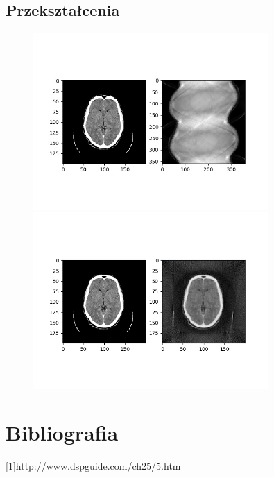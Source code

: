 \documentclass{article}
\begin{document}
\subsection{Przekształcenia}
\begin{figure}[H]
\begin{center}
\includegraphics[width=0.8\textwidth]{./brain/sinogram.jpg}
\includegraphics[width=0.8\textwidth]{./brain/reconstructedImg2.png}
\end{center}
\end{figure}


\section{Bibliografia}
[1]{http://www.dspguide.com/ch25/5.htm}
\end{document}
